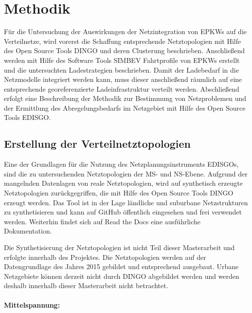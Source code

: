\section{Methodik}\label{chap:Methodik}

Für die Untersuchung der Auswirkungen der Netzintegration von \glspl{EPKW} auf die Verteilnetze, wird vorerst die Schaffung entsprechende Netztopologien mit Hilfe des Open Source Tools \gls{DINGO} und deren Clusterung beschrieben.
Anschließend werden mit Hilfe des Software Tools \gls{SIMBEV} Fahrtprofile von \glspl{EPKW} erstellt und die untersuchten Ladestrategien beschrieben.
Damit der Ladebedarf in die Netzmodelle integriert werden kann, muss dieser anschließend räumlich auf eine entsprechende georeferenzierte Ladeinfrastruktur verteilt werden.
Abschließend erfolgt eine Beschreibung der Methodik zur Bestimmung von Netzproblemen und der Ermittlung des Abregelungsbedarfs im Netzgebiet mit Hilfe des Open Source Tools \gls{EDISGO}.


\subsection{Erstellung der Verteilnetztopologien}\label{chap:dingo_theo}

Eine der Grundlagen für die Nutzung des Netzplanungsinstruments \glspl{EDISGO}, sind die zu untersuchenden Netztopologien der \gls{MS}- und \gls{NS}-Ebene.
Aufgrund der mangelnden Datenlagen von reale Netztopologien, wird auf synthetisch erzeugte Netztopologien zurückgegriffen, die mit Hilfe des Open Source Tools \gls{DINGO} erzeugt werden.
Das Tool ist in der Lage ländliche und suburbane Netzstrukturen zu synthetisieren und kann auf GitHub \cite{dingo2019} öffentlich eingesehen und frei verwendet werden.
Weiterhin findet sich auf Read the Docs \cite{dingo-docs2019} eine ausführliche Dokumentation.\medskip

Die Synthetisierung der Netztopologien ist nicht Teil dieser Masterarbeit und erfolgte innerhalb des \openego Projektes. \cite{Mueller2019}
Die Netztopologien werden auf der Datengrundlage des Jahres \num{2015} gebildet und entsprechend ausgebaut.
Urbane Netzgebiete können derzeit nicht durch \gls{DINGO} abgebildet werden und werden deshalb innerhalb dieser Masterarbeit nicht betrachtet.


\paragraph{Mittelspannung:}

